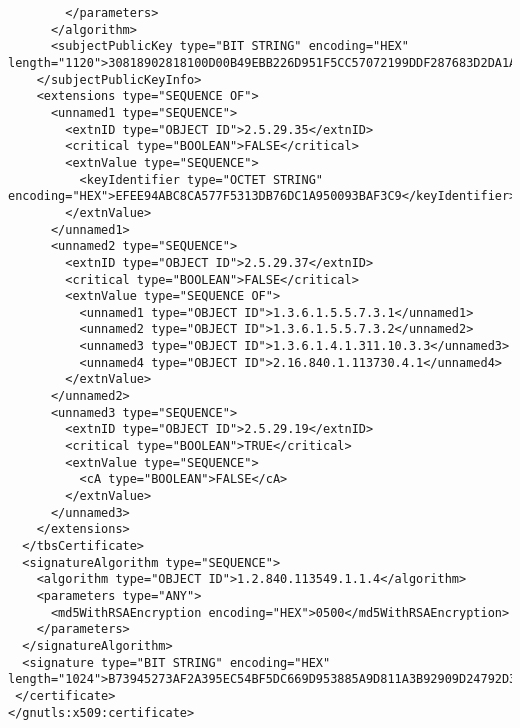 \begin{verbatim}
        </parameters>
      </algorithm>
      <subjectPublicKey type="BIT STRING" encoding="HEX" length="1120">30818902818100D00B49EBB226D951F5CC57072199DDF287683D2DA1A0EFCC96BFF73164777C78C3991E92EDA66584E7B97BAB4BE68D595D225557E01E7E57B5C35C04B491948C5C427AD588D8C6989764996D6D44E17B65CCFC86F3B4842DE559B730C1DE3AEF1CE1A328AFF8A357EBA911E1F7E8FC1598E21E4BF721748C587F50CF46157D950203010001</subjectPublicKey>
    </subjectPublicKeyInfo>
    <extensions type="SEQUENCE OF">
      <unnamed1 type="SEQUENCE">
        <extnID type="OBJECT ID">2.5.29.35</extnID>
        <critical type="BOOLEAN">FALSE</critical>
        <extnValue type="SEQUENCE">
          <keyIdentifier type="OCTET STRING" encoding="HEX">EFEE94ABC8CA577F5313DB76DC1A950093BAF3C9</keyIdentifier>
        </extnValue>
      </unnamed1>
      <unnamed2 type="SEQUENCE">
        <extnID type="OBJECT ID">2.5.29.37</extnID>
        <critical type="BOOLEAN">FALSE</critical>
        <extnValue type="SEQUENCE OF">
          <unnamed1 type="OBJECT ID">1.3.6.1.5.5.7.3.1</unnamed1>
          <unnamed2 type="OBJECT ID">1.3.6.1.5.5.7.3.2</unnamed2>
          <unnamed3 type="OBJECT ID">1.3.6.1.4.1.311.10.3.3</unnamed3>
          <unnamed4 type="OBJECT ID">2.16.840.1.113730.4.1</unnamed4>
        </extnValue>
      </unnamed2>
      <unnamed3 type="SEQUENCE">
        <extnID type="OBJECT ID">2.5.29.19</extnID>
        <critical type="BOOLEAN">TRUE</critical>
        <extnValue type="SEQUENCE">
          <cA type="BOOLEAN">FALSE</cA>
        </extnValue>
      </unnamed3>
    </extensions>
  </tbsCertificate>
  <signatureAlgorithm type="SEQUENCE">
    <algorithm type="OBJECT ID">1.2.840.113549.1.1.4</algorithm>
    <parameters type="ANY">
      <md5WithRSAEncryption encoding="HEX">0500</md5WithRSAEncryption>
    </parameters>
  </signatureAlgorithm>
  <signature type="BIT STRING" encoding="HEX" length="1024">B73945273AF2A395EC54BF5DC669D953885A9D811A3B92909D24792D36A44EC27E1C463AF8738BEFD29B311CCE8C6D9661BEC30911DAABB39B8813382B32D2E259581EBCD26C495C083984763966FF35D1DEFE432891E610C85072578DA7423244A8F5997B41A1F44E61F4F22C94375775055A5E72F25D5E4557467A91BD4251</signature>
 </certificate>
</gnutls:x509:certificate>

\end{verbatim}

